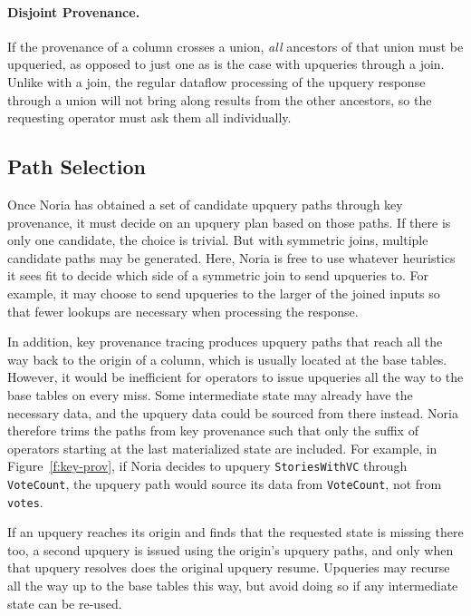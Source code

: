 \paragraph{Disjoint Provenance.}
If the provenance of a column crosses a union, \emph{all} ancestors of that
union must be upqueried, as opposed to just one as is the case with upqueries
through a join. Unlike with a join, the regular dataflow processing of the
upquery response through a union will not bring along results from the other
ancestors, so the requesting operator must ask them all individually.

\subsection{Path Selection}
\label{s:upquery:selection}

Once Noria has obtained a set of candidate upquery paths through key provenance,
it must decide on an upquery plan based on those paths. If there is only one
candidate, the choice is trivial. But with symmetric joins, multiple candidate
paths may be generated. Here, Noria is free to use whatever heuristics it sees
fit to decide which side of a symmetric join to send upqueries to. For example,
it may choose to send upqueries to the larger of the joined inputs so that fewer
lookups are necessary when processing the response.

In addition, key provenance tracing produces upquery paths that reach all the
way back to the origin of a column, which is usually located at the base tables.
However, it would be inefficient for operators to issue upqueries all the way to
the base tables on every miss. Some intermediate state may already have the
necessary data, and the upquery data could be sourced from there instead. Noria
therefore trims the paths from key provenance such that only the suffix of
operators starting at the last materialized state are included. For example, in
Figure~\ref{f:key-prov}, if Noria decides to upquery \texttt{StoriesWithVC}
through \texttt{VoteCount}, the upquery path would source its data from
\texttt{VoteCount}, not from \texttt{votes}.

If an upquery reaches its origin and finds that the requested state is missing
there too, a second upquery is issued using the origin's upquery paths, and only
when that upquery resolves does the original upquery resume. Upqueries may
recurse all the way up to the base tables this way, but avoid doing so if any
intermediate state can be re-used.

